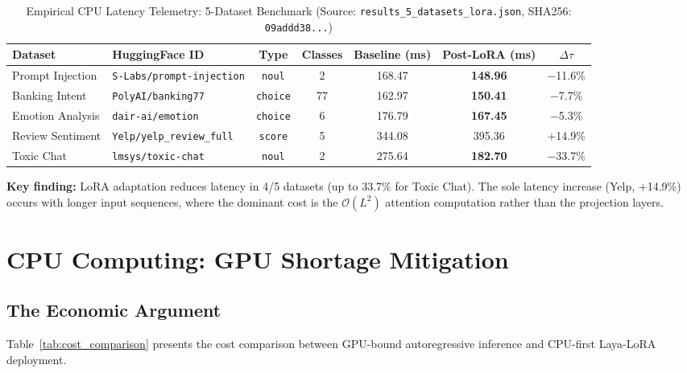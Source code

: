 \documentclass[10pt,journal,compsoc]{IEEEtran}
\theoremstyle{remark}
\begin{document}
\begin{table}[htbp]
\caption{Empirical CPU Latency Telemetry: 5-Dataset Benchmark (Source: \texttt{results\_5\_datasets\_lora.json}, SHA256: \texttt{09addd38...})}
\label{tab:5_datasets}
\centering
\begin{tabular}{llccccc}
\toprule
\textbf{Dataset} & \textbf{HuggingFace ID} & \textbf{Type} & \textbf{Classes} & \textbf{Baseline (ms)} & \textbf{Post-LoRA (ms)} & \textbf{$\Delta\tau$} \\
\midrule
Prompt Injection & \texttt{S-Labs/prompt-injection} & \texttt{noul} & 2 & 168.47 & \textbf{148.96} & $-$11.6\% \\
Banking Intent & \texttt{PolyAI/banking77} & \texttt{choice} & 77 & 162.97 & \textbf{150.41} & $-$7.7\% \\
Emotion Analysis & \texttt{dair-ai/emotion} & \texttt{choice} & 6 & 176.79 & \textbf{167.45} & $-$5.3\% \\
Review Sentiment & \texttt{Yelp/yelp\_review\_full} & \texttt{score} & 5 & 344.08 & 395.36 & $+$14.9\% \\
Toxic Chat & \texttt{lmsys/toxic-chat} & \texttt{noul} & 2 & 275.64 & \textbf{182.70} & $-$33.7\% \\
\bottomrule
\end{tabular}
\end{table}

\textbf{Key finding:} LoRA adaptation reduces latency in 4/5 datasets (up to 33.7\% for Toxic Chat). The sole latency increase (Yelp, $+$14.9\%) occurs with longer input sequences, where the dominant cost is the $\mathcal{O}(L^2)$ attention computation rather than the projection layers.

\section{CPU Computing: GPU Shortage Mitigation}

\subsection{The Economic Argument}

Table~\ref{tab:cost_comparison} presents the cost comparison between GPU-bound autoregressive inference and CPU-first Laya-LoRA deployment.
\end{document}

